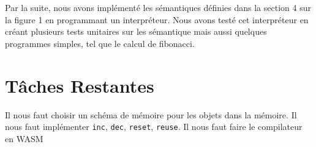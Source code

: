 \documentclass{rapportECL}
\begin{document}
Par la suite, nous avons implémenté les sémantiques définies dans la section 4 sur la figure 1 en programmant un interpréteur. Nous avons testé cet interpréteur en créant plusieurs tests unitaires sur les sémantique mais aussi quelques programmes simples, tel que le calcul de fibonacci.

\section{Tâches Restantes}

Il nous faut choisir un schéma de mémoire pour les objets dans la mémoire.
Il nous faut implémenter \verb|inc|, \verb|dec|, \verb|reset|, \verb|reuse|.
Il nous faut faire le compilateur en WASM

\printbibliography
\end{document}

